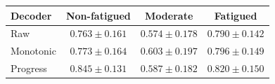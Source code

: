 \begin{tabular}{lccc}
\toprule
Decoder & Non-fatigued & Moderate & Fatigued \\
\midrule
Raw & $0.763 \pm 0.161$ & $0.574 \pm 0.178$ & $0.790 \pm 0.142$ \\
Monotonic & $0.773 \pm 0.164$ & $0.603 \pm 0.197$ & $0.796 \pm 0.149$ \\
Progress & $0.845 \pm 0.131$ & $0.587 \pm 0.182$ & $0.820 \pm 0.150$ \\
\bottomrule
\end{tabular}